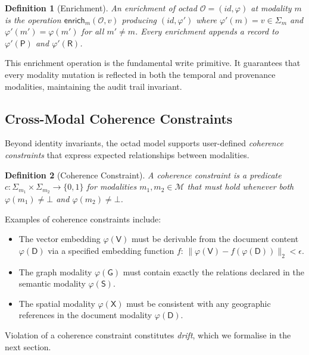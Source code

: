 \documentclass[11pt,twocolumn]{article}
\newtheorem{definition}{Definition}[section]
\newcommand{\octad}{\mathcal{O}}
\newcommand{\modset}{\mathcal{M}}
\begin{document}
\begin{definition}[Enrichment]\label{def:enrichment}
An \emph{enrichment} of octad $\octad = (\mathit{id}, \varphi)$ at modality
$m$ is the operation $\mathsf{enrich}_m(\octad, v)$ producing
$(\mathit{id}, \varphi')$ where $\varphi'(m) = v \in \Sigma_m$ and
$\varphi'(m') = \varphi(m')$ for all $m' \neq m$.  Every enrichment appends
a record to $\varphi'(\mathsf{P})$ and $\varphi'(\mathsf{R})$.
\end{definition}

This enrichment operation is the fundamental write primitive.  It guarantees
that every modality mutation is reflected in both the temporal and provenance
modalities, maintaining the audit trail invariant.

\subsection{Cross-Modal Coherence Constraints}

Beyond identity invariants, the octad model supports user-defined
\emph{coherence constraints} that express expected relationships between
modalities.

\begin{definition}[Coherence Constraint]\label{def:coherence}
A \emph{coherence constraint} is a predicate
$c : \Sigma_{m_1} \times \Sigma_{m_2} \to \{0, 1\}$ for modalities
$m_1, m_2 \in \modset$ that must hold whenever both
$\varphi(m_1) \neq \bot$ and $\varphi(m_2) \neq \bot$.
\end{definition}

Examples of coherence constraints include:
\begin{itemize}[leftmargin=*]
  \item The vector embedding $\varphi(\mathsf{V})$ must be derivable from
    the document content $\varphi(\mathsf{D})$ via a specified embedding
    function $f$: $\|\varphi(\mathsf{V}) - f(\varphi(\mathsf{D}))\|_2 < \epsilon$.
  \item The graph modality $\varphi(\mathsf{G})$ must contain exactly the
    relations declared in the semantic modality $\varphi(\mathsf{S})$.
  \item The spatial modality $\varphi(\mathsf{X})$ must be consistent with
    any geographic references in the document modality $\varphi(\mathsf{D})$.
\end{itemize}

Violation of a coherence constraint constitutes \emph{drift}, which we
formalise in the next section.
\end{document}
